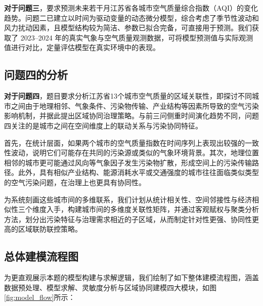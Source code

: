 \documentclass[a4paper,12pt]{article}
\begin{document}
	\textbf{对于问题三}，要求预测未来若干月江苏省各城市空气质量综合指数（AQI）的变化趋势。问题二已建立以时间为驱动变量的动态微分模型，综合考虑了季节性波动和风力扰动因素，且模型结构较为简洁、参数已拟合完备，可直接用于预测。我们获取了 2023–2024 年的真实气象与空气质量观测数据，可将模型预测值与实际观测值进行对比，定量评估模型在真实环境中的表现。

	\subsection{问题四的分析}  
	
	\textbf{对于问题四}，题目要求分析江苏省13个城市空气质量的区域关联性，即探讨不同城市之间由于地理相邻、气象条件、污染物传输、产业结构等因素所导致的空气污染影响机制，并据此提出区域协同治理策略。与前三问侧重时间演化趋势不同，问题四关注的是城市之间在空间维度上的联动关系与污染协同特征。
	
	首先，在统计层面，如果两个城市的空气质量指数在时间序列上表现出较强的一致性波动，说明它们可能存在共同的污染源或类似的气象环境背景。其次，地理位置相邻的城市更可能通过风向等气象因子发生污染物扩散，形成空间上的污染传输路径。此外，具有相似产业结构、能源消耗水平或交通强度的城市往往面临类似类型的空气污染问题，在治理上也更具有协同性。
	
	为系统刻画这些城市间的多维联系，我们计划从统计相关性、空间邻接性与经济相似性三个维度入手，构建城市间的多维度关联性矩阵，并通过客观赋权与聚类分析方法，划分出污染特征与治理需求相近的子区域，从而制定针对性更强、协同性更高的区域联防联控策略。
	
	\subsection{总体建模流程图}
	
	为更直观展示本题的模型构建与求解逻辑，我们绘制了如下整体建模流程图，涵盖数据预处理、模型求解、灵敏度分析与区域协同建模四大模块，如图\ref{fig:model_flow}所示：
	
\end{document}
